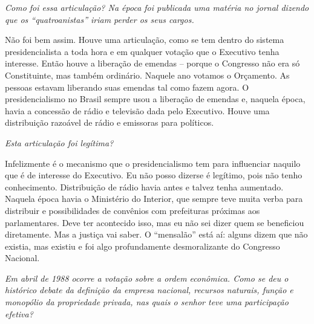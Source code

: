 \medskip

\emph{Como foi essa articulação? Na época foi publicada uma matéria no
jornal dizendo que os ``quatroanistas'' iriam perder os seus cargos.}

Não foi bem assim. Houve uma articulação, como se tem
dentro do sistema presidencialista a toda hora e em qualquer votação que
o Executivo tenha interesse. Então houve a liberação de emendas --
porque o Congresso não era só Constituinte, mas também ordinário.
Naquele ano votamos o Orçamento. As pessoas estavam liberando suas
emendas tal como fazem agora. O presidencialismo no Brasil sempre usou a
liberação de emendas e, naquela época, havia a concessão de rádio e
televisão dada pelo Executivo. Houve uma distribuição razoável de rádio
e emissoras para políticos.

\medskip

\emph{Esta articulação foi legítima?}

Infelizmente é o mecanismo que o presidencialismo tem
para influenciar naquilo que é de interesse do Executivo. Eu não posso
dizerse é legítimo, pois não tenho conhecimento. Distribuição de rádio
havia antes e talvez tenha aumentado. Naquela época havia o Ministério
do Interior, que sempre teve muita verba para distribuir e
possibilidades de convênios com prefeituras próximas aos parlamentares.
Deve ter acontecido isso, mas eu não sei dizer quem se beneficiou
diretamente. Mas a justiça vai saber. O ``mensalão'' está aí: alguns
dizem que não existia, mas existiu e foi algo profundamente
desmoralizante do Congresso Nacional.

\medskip

\emph{Em abril de 1988 ocorre a votação sobre a ordem econômica. Como
se deu o histórico debate da definição da empresa nacional, recursos
naturais, função e monopólio da propriedade privada, nas quais o senhor
teve uma participação efetiva?}

